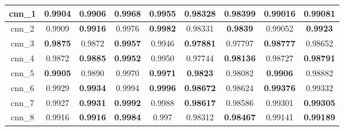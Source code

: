 \begin{table}[p]
\begin{tabular} {|c|c|c|c|c|c|c|c|c| }
        cnn\_1   & 0.9904                              & \textbf{0.9906}                     & \textbf{0.9968}             & 0.9955                              & 0.98328                     & \textbf{0.98399}                     & 0.99016                              & \textbf{0.99081}            \\ \hline
        cnn\_2   & 0.9909                              & \textbf{0.9916}                     & 0.9976                      & \textbf{0.9982}                     & 0.98331                     & \textbf{0.9839}                      & 0.99052                              & \textbf{0.9923}             \\ \hline
        cnn\_3   & \textbf{0.9875}                     & 0.9872                              & \textbf{0.9957}             & 0.9946                              & \textbf{0.97881}            & 0.97797                              & \textbf{0.98777}                     & 0.98652                     \\ \hline
        cnn\_4   & 0.9872                              & \textbf{0.9885}                     & \textbf{0.9952}             & 0.9950                              & 0.97744                     & \textbf{0.98136}                     & 0.98727                              & \textbf{0.98791}            \\ \hline
        cnn\_5   & \textbf{0.9905}                     & 0.9890                              & 0.9970                      & \textbf{0.9971}                     & \textbf{0.9823}             & 0.98082                              & \textbf{0.9906}                      & 0.98882                     \\ \hline
        cnn\_6   & 0.9929                              & \textbf{0.9934}                     & \cellcolor{green!50}0.9994  & \textbf{0.9996}                     & \textbf{0.98672}            & 0.98624                              & \textbf{\cellcolor{green!50}0.99376} & \cellcolor{green!50}0.99332 \\ \hline
        cnn\_7   & 0.9927                              & \textbf{0.9931}                     & \textbf{0.9992}             & 0.9988                              & \textbf{0.98617}            & 0.98586                              & 0.99301                              & \textbf{0.99305}            \\ \hline
        cnn\_8   & 0.9916                              & \textbf{0.9916}                     & \textbf{0.9984}             & 0.997                               & 0.98312                     & \textbf{0.98467}                     & 0.99141                              & \textbf{0.99189}            \\ \hline

\end{tabular}
\end{table}
